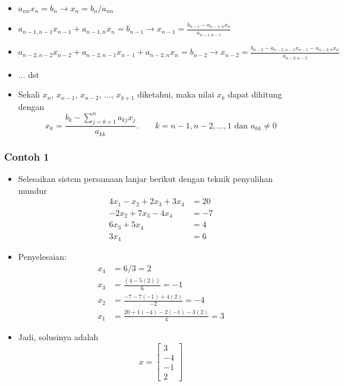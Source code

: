 \documentclass[pdflatex,compress,mathserif]{beamer}
\begin{document}
\begin{frame}
	\begin{itemize}
		\item[] $ a_{nn}x_n = b_n \rightarrow x_n = b_n / a_{nn} $
		\item[] $ a_{n-1,n-1}x_{n-1} + a_{n-1,n}x_{n} = b_{n-1} \rightarrow x_{n-1} = \frac{b_{n-1} - a_{n-1,n}x_n}{a_{n-1,n-1}}$
		\item[] $ a_{n-2,n-2}x_{n-2} + a_{n-2,n-1}x_{n-1} + a_{n-2,n}x_{n} = b_{n-2} \rightarrow x_{n-2} = \frac{b_{n-2} - a_{n-2,n-1}x_{n-1} - a_{n-2,n}x_{n}}{a_{n-2,n-2}}$
		\item[] $\dots$ dst
		\item Sekali $ x_n $, $ x_{n-1} $, $ x_{n-2} $, $\dots$, $ x_{k+1} $ diketahui, maka nilai $ x_k $ dapat dihitung dengan
		\[ x_k = \frac{b_k - \sum_{j=k+1}^{n}a_{kj}x_j}{a_{kk}}.\qquad k=n-1, n-2, \dots, 1 \text{ dan } a_{kk} \neq 0 \]
	\end{itemize}
\end{frame}

\begin{frame}
	\frametitle{Contoh 1}
	\begin{itemize}
		\item Selesaikan sistem persamaan lanjar berikut dengan teknik penyulihan mundur
		\begin{align*}
			4x_1 - x_2 + 2x_3 + 3x_4 &= 20 \\
			-2x_2 + 7x_3 - 4x_4 &= -7 \\
			6x_3 + 5x_4 &= 4 \\
			3x_4 &= 6
		\end{align*}
	\end{itemize}
\end{frame}

\begin{frame}
	\begin{itemize}
		\item Penyelesaian:
		\begin{align*}
		x_4 &= 6/3 = 2 \\
		x_3 &= \frac{(4-5(2))}{6} = -1 \\
		x_2 &= \frac{-7-7(-1)+4(2)}{-2} = -4 \\
		x_1 &= \frac{20 + 1(-4) - 2(-1)-3(2)}{4} = 3
		\end{align*}
		\item Jadi, solusinya adalah \[ x = \begin{bmatrix}
			3 \\ -4 \\ -1 \\ 2
		\end{bmatrix} \]
	\end{itemize}
\end{frame}
\end{document}
